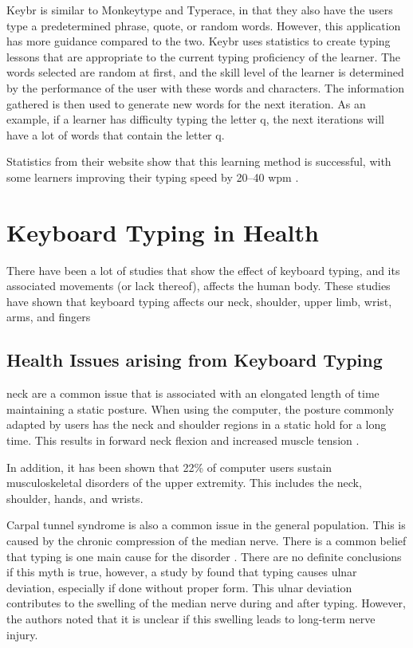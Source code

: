 \documentclass{report}
\begin{document}
Keybr is similar to Monkeytype and Typerace, in that they also have the users
type a predetermined phrase, quote, or random words. However, this application
has more guidance compared to the two. Keybr uses statistics to create typing
lessons that are appropriate to the current typing proficiency of the learner.
The words selected are random at first, and the skill level of the learner is
determined by the performance of the user with these words and characters. The
information gathered is then used to generate new words for the next iteration.
As an example, if a learner has difficulty typing the letter q, the next
iterations will have a lot of words that contain the letter q.

Statistics from their website show that this learning method is successful, with
some learners improving their typing speed by 20--40 \ac{wpm} \parencite{keybr}.

\section{Keyboard Typing in Health}

There have been a lot of studies that show the effect of keyboard typing, and
its associated movements (or lack thereof), affects the human body. These
studies have shown that keyboard typing affects our neck, shoulder,
upper limb, wrist, arms, and fingers \parencite{szeto2005, baker2007digit}

\subsection{Health Issues arising from Keyboard Typing}

\ac{neck} are a common issue that is associated with an elongated length of time
maintaining a static posture. When using the computer, the posture commonly
adapted by users has the neck and shoulder regions in a static hold for a long
time. This results in forward neck flexion and increased muscle tension
\parencite{szeto2005}.

In addition, it has been shown that 22\% of computer users sustain
musculoskeletal disorders of the upper extremity. This includes the neck,
shoulder, hands, and wrists. \parencite{gerr2002}

Carpal tunnel syndrome is also a common issue in the general population. This is
caused by the chronic compression of the median nerve. There is a common belief
that typing is one main cause for the disorder \parencite{carpal-myth}. There
are no definite conclusions if this myth is true, however, a study by
\citeauthor{toosi2015} found that typing causes ulnar deviation, especially if
done without proper form. This ulnar deviation contributes to the swelling of
the median nerve during and after typing. However, the authors noted that it is
unclear if this swelling leads to long-term nerve injury.
\end{document}
